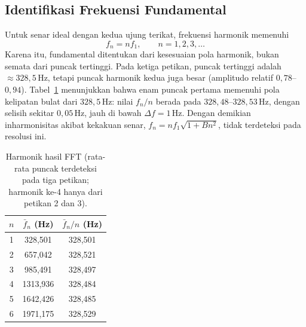 \documentclass[aps,prl,twocolumn,superscriptaddress]{revtex4-2}
\begin{document}
    \subsection{Identifikasi Frekuensi Fundamental}

        Untuk senar ideal dengan kedua ujung terikat, frekuensi harmonik memenuhi
        \begin{equation}
            f_n = n f_1,
            \qquad n=1,2,3,\ldots
            \label{eq:harmonic-frequency}
        \end{equation}
        Karena itu, fundamental ditentukan dari kesesuaian pola harmonik, bukan semata dari puncak tertinggi. 
        Pada ketiga petikan, puncak tertinggi adalah $\approx328{,}5\,\mathrm{Hz}$, tetapi puncak harmonik kedua juga besar (amplitudo relatif $0{,}78$--$0{,}94$). 
        Tabel~\ref{tab:harmonics} menunjukkan bahwa enam puncak pertama memenuhi pola kelipatan bulat dari $328{,}5\,\mathrm{Hz}$: nilai $f_n/n$ berada pada $328{,}48$--$328{,}53\,\mathrm{Hz}$, dengan selisih sekitar $0{,}05\,\mathrm{Hz}$, jauh di bawah $\Delta f=1\,\mathrm{Hz}$. 
        Dengan demikian inharmonisitas akibat kekakuan senar, $f_n=nf_1\sqrt{1+Bn^2}$, tidak terdeteksi pada resolusi ini.
        \begin{table}[htbp]
            \centering
            \caption{Harmonik hasil FFT (rata-rata puncak terdeteksi pada tiga petikan; harmonik ke-4 hanya dari petikan 2 dan 3).}
            \label{tab:harmonics}
            \begin{tabular}{ccc}
                \hline
                $n$ & $\bar f_n$ (Hz) & $\bar f_n/n$ (Hz) \\
                \hline
                1 & 328{,}501 & 328{,}501 \\
                2 & 657{,}042 & 328{,}521 \\
                3 & 985{,}491 & 328{,}497 \\
                4 & 1313{,}936 & 328{,}484 \\
                5 & 1642{,}426 & 328{,}485 \\
                6 & 1971{,}175 & 328{,}529 \\
                \hline
            \end{tabular}
        \end{table}
\end{document}
